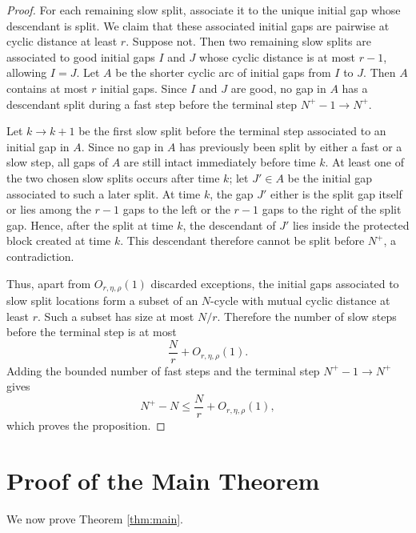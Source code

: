 \documentclass[11pt]{article}
\theoremstyle{remark}
\begin{document}
\begin{proof}
\bigskip
\noindent
For each remaining slow split, associate it to the unique initial gap whose descendant is split. We claim that these associated initial gaps are pairwise at cyclic distance at least $r$. Suppose not. Then two remaining slow splits are associated to good initial gaps $I$ and $J$ whose cyclic distance is at most $r-1$, allowing $I=J$. Let $A$ be the shorter cyclic arc of initial gaps from $I$ to $J$. Then $A$ contains at most $r$ initial gaps. Since $I$ and $J$ are good, no gap in $A$ has a descendant split during a fast step before the terminal step $N^+-1\to N^+$.

\bigskip
\noindent
Let $k\to k+1$ be the first slow split before the terminal step associated to an initial gap in $A$. Since no gap in $A$ has previously been split by either a fast or a slow step, all gaps of $A$ are still intact immediately before time $k$. At least one of the two chosen slow splits occurs after time $k$; let $J'\in A$ be the initial gap associated to such a later split. At time $k$, the gap $J'$ either is the split gap itself or lies among the $r-1$ gaps to the left or the $r-1$ gaps to the right of the split gap. Hence, after the split at time $k$, the descendant of $J'$ lies inside the protected block created at time $k$. This descendant therefore cannot be split before $N^+$, a contradiction.

\bigskip
\noindent
Thus, apart from $O_{r,\eta,\rho}(1)$ discarded exceptions, the initial gaps associated to slow split locations form a subset of an $N$-cycle with mutual cyclic distance at least $r$. Such a subset has size at most $N/r$. Therefore the number of slow steps before the terminal step is at most
\[
    \frac Nr+O_{r,\eta,\rho}(1).
\]
Adding the bounded number of fast steps and the terminal step $N^+-1\to N^+$ gives
\[
    N^+-N
    \leq
    \frac Nr+O_{r,\eta,\rho}(1),
\]
which proves the proposition.
\end{proof}

\section{Proof of the Main Theorem}

We now prove Theorem \ref{thm:main}.
\end{document}
